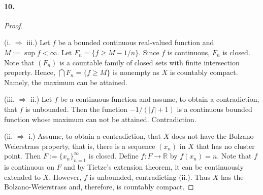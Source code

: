 \paragraph{10.}
\begin{proof}
  $\,$\par
  (i. $\Rightarrow$ iii.) Let $f$ be a bounded continuous real-valued function
  and $M := \sup f < \infty$. Let $F_n = \{f \ge M - 1/n\}$. Since $f$ is
  continuous, $F_n$ is closed. Note that $(F_n)$ is a countable family of
  closed sets with finite intersection property. Hence, $\bigcap F_n =
  \{f \ge M\}$ is nonempty as $X$ is countably compact. Namely, the maximum
  can be attained. 
  
  (iii. $\Rightarrow$ ii.) Let $f$ be a continuous function and assume, to
  obtain a contradiction, that $f$ is unbounded. Then the function 
  $-1/(|f| + 1)$ is a continuous bounded function whose maximum can not be 
  attained. Contradiction.
  
  (ii. $\Rightarrow$ i.) Assume, to obtain a contradiction, that $X$ does not
  have the Bolzano-Weierstrass property, that is, there is a sequence $(x_n)$
  in $X$ that has no cluster point. Then $F := \{x_n\}_{n=1}^\infty$ is closed.
  Define $f: F \to \mathbb{R}$ by $f(x_n) = n$. Note that $f$ is continuous on
  $F$ and by Tietze's extension theorem, it can be continuously extended to 
  $X$. However, $f$ is unbounded, contradicting (ii.). Thus $X$ has the
  Bolzano-Weierstrass and, therefore, is countably compact. 
\end{proof}























